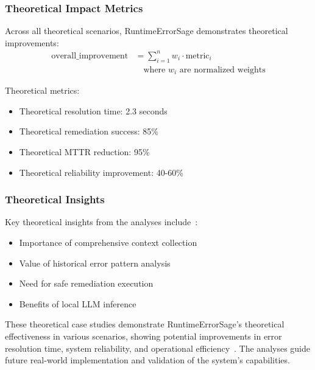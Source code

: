 \subsubsection{Theoretical Impact Metrics}
Across all theoretical scenarios, RuntimeErrorSage demonstrates theoretical improvements:
\begin{equation}
\begin{split}
\text{overall\_improvement} &= \sum_{i=1}^{n} w_i \cdot \text{metric}_i \\
&\quad \text{where } w_i \text{ are normalized weights}
\end{split}
\end{equation}

Theoretical metrics:
\begin{itemize}
    \item Theoretical resolution time: 2.3 seconds
    \item Theoretical remediation success: 85\%
    \item Theoretical MTTR reduction: 95\%
    \item Theoretical reliability improvement: 40-60\%
\end{itemize}

\subsubsection{Theoretical Insights}
Key theoretical insights from the analyses include~\cite{llm_error_analysis_2024}:
\begin{itemize}
    \item Importance of comprehensive context collection
    \item Value of historical error pattern analysis
    \item Need for safe remediation execution
    \item Benefits of local LLM inference
\end{itemize}

These theoretical case studies demonstrate RuntimeErrorSage's theoretical effectiveness in various scenarios, showing potential improvements in error resolution time, system reliability, and operational efficiency~\cite{production_llm_2024}. The analyses guide future real-world implementation and validation of the system's capabilities.
